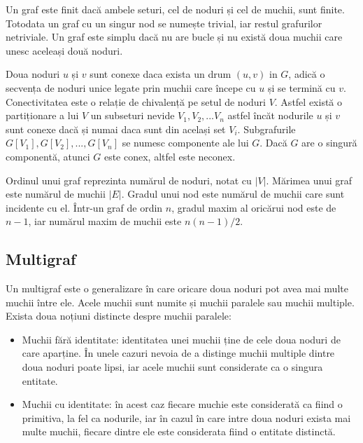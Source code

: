 Un graf este finit dacă ambele seturi, cel de noduri și cel de muchii, sunt finite. Totodata un graf cu un singur nod se numește trivial, iar restul grafurilor netriviale.
Un graf este simplu dacă nu are bucle și nu există doua muchii care unesc aceleași două noduri.\newline

Doua noduri \(u\) și \(v\) sunt conexe daca exista un drum \((u,v)\) in \(G\), adică o secvența de noduri unice legate prin muchii care începe cu \(u\) și se termină cu \(v\).
Conectivitatea este o relație de chivalență pe setul de noduri \(V\). Astfel există o partiționare a lui \(V\) un subseturi nevide \(V_1,V_2,...V_n\) astfel încăt nodurile \(u\) și \(v\)
sunt conexe dacă și numai daca sunt din același set \(V_i\). Subgrafurile \(G[V_1], G[V_2], ... , G[V_n]\) se numesc componente ale lui \(G\). Dacă \(G\) are o singură componentă, atunci
\(G\) este conex, altfel este neconex.\newline

Ordinul unui graf reprezinta numărul de noduri, notat cu \(|V|\). Mărimea unui graf este numărul de muchii \(|E|\).
Gradul unui nod este numărul de muchii care sunt incidente cu el.
Într-un graf de ordin \(n\), gradul maxim al oricărui nod este de \(n-1\), iar numărul maxim de muchii este \(n(n-1)/2\).

\subsection{Multigraf}

Un multigraf este o generalizare în care oricare doua noduri pot avea mai multe muchii între ele. Acele muchii sunt numite și muchii paralele sau muchii multiple.
Exista doua noțiuni distincte despre muchii paralele:\newline

\begin{itemize}
\item Muchii fără identitate: identitatea unei muchii ține de cele doua noduri de care aparține. 
În unele cazuri nevoia de a distinge muchii multiple dintre doua noduri poate lipsi, iar acele muchii sunt considerate ca o 
singura entitate.\newline
\item Muchii cu identitate: în acest caz fiecare muchie este considerată ca fiind o primitiva, la fel ca nodurile, 
iar în cazul în care intre doua noduri exista mai multe muchii, fiecare dintre ele este considerata fiind o entitate distinctă.\newline
\end{itemize}

